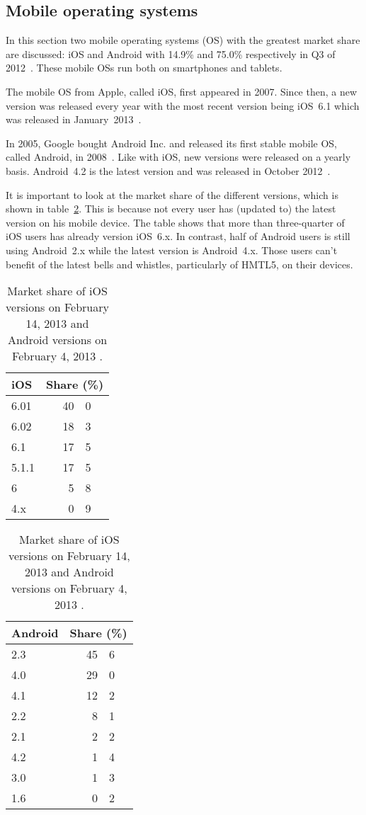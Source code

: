 \documentclass[a4paper]{artikel3}
\begin{document}
\subsection{Mobile operating systems}
In this section two mobile operating systems (OS) with the greatest market share are discussed: iOS and Android with 14.9\% and 75.0\% respectively in Q3 of 2012~\cite{Protalinski2012}.
These mobile OSs run both on smartphones and tablets.

The mobile OS from Apple, called iOS, first appeared in 2007.
Since then, a new version was released every year with the most recent version being iOS~6.1 which was released in January~2013~\cite{Deitel2012,PhilDutson2012,Apple2013}.

In 2005, Google bought Android Inc. and released its first stable mobile OS, called Android, in 2008~\cite{Satyesh2012}.
Like with iOS, new versions were released on a yearly basis.
Android~4.2 is the latest version and was released in October 2012~\cite{Sawers2012}.

It is important to look at the market share of the different versions, which is shown in table~\ref{table:mos-versions}.
This is because not every user has (updated to) the latest version on his mobile device.
The table shows that more than three-quarter of iOS users has already version iOS~6.x.
In contrast, half of Android users is still using Android~2.x while the latest version is Android~4.x. 
Those users can't benefit of the latest bells and whistles, particularly of HMTL5, on their devices.

\begin{table}[t]
\centering
\begin{tabular}[b]{l r@{.}l}
\toprule
\textbf{iOS}    	& \multicolumn{2}{c}{\textbf{Share (\%)}} \\
\midrule
6.01		& 40 & 0 \\
6.02		& 18 & 3 \\
6.1		& 17 & 5	\\
5.1.1	& 17 & 5 \\
6		& 5 & 8 \\
4.x		& 0 & 9 \\
\bottomrule
\end{tabular}
\quad
\begin{tabular}[b]{l r@{.}l}
\toprule
\textbf{Android}	& \multicolumn{2}{c}{\textbf{Share (\%)}} \\
\midrule
2.3		& 45 & 6 \\
4.0		& 29 & 0 \\
4.1		& 12 & 2 \\
2.2		& 8 & 1 \\
2.1		& 2 & 2 \\
4.2		& 1 & 4 \\
3.0		& 1 & 3 \\
1.6 		& 0 & 2 \\
\bottomrule
\end{tabular}
\caption{Market share of iOS versions on February 14, 2013 and Android versions on February 4, 2013 \protect\cite{Sylvain2013,Android2013}.}
\label{table:mos-versions}
\end{table}
\end{document}
